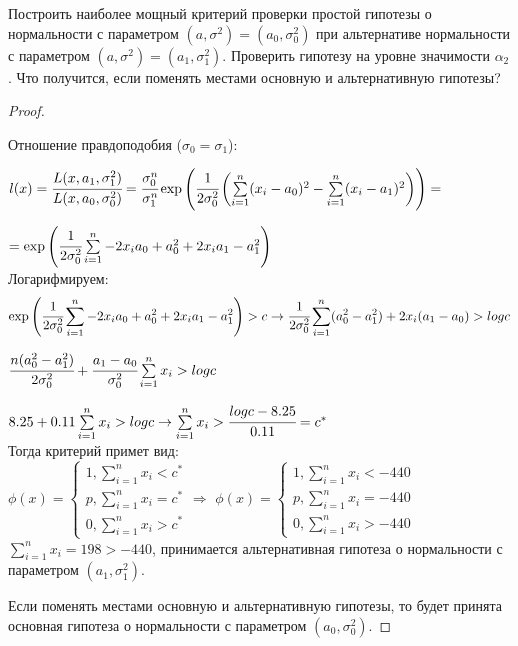 \begin{problem}
	Построить наиболее мощный критерий проверки простой гипотезы о нормальности с параметром $(a, \sigma^2)=(a_0, \sigma_0^2)$ при альтернативе нормальности с параметром $(a, \sigma^2)=(a_1, \sigma_1^2)$. Проверить гипотезу на уровне значимости $\alpha_2$. Что получится, если поменять местами основную и альтернативную гипотезы?
\end{problem}

\begin{proof}
	$ $
	
	Отношение правдоподобия ($\sigma_0 = \sigma_1$):
	
		$l(x)=\cfrac{L(x, a_1, \sigma_1^2)}{L(x, a_0, \sigma_0^2)}=\cfrac{\sigma_0^n}{\sigma_1^n}\exp\left(\cfrac{1}{2\sigma_0^2}\left(\sum\limits_{i=1}^n(x_i-a_0)^2-\sum\limits_{i=1}^n(x_i-a_1)^2\right)\right)=$
		
		$=\exp\left(\cfrac{1}{2\sigma_0^2}\sum\limits_{i=1}^n-2x_ia_0+a_0^2+2x_ia_1-a_1^2\right)$
	\\
	
	Логарифмируем:
	\begin{equation}
		\exp\left(\cfrac{1}{2\sigma_0^2}\sum\limits_{i=1}^n-2x_ia_0+a_0^2+2x_ia_1-a_1^2\right)>c\rightarrow \cfrac{1}{2\sigma_0^2}\sum\limits_{i=1}^n(a_0^2-a_1^2)+2x_i(a_1-a_0)>log c
	\end{equation}


		$\cfrac{n(a_0^2-a_1^2)}{2\sigma_0^2}+\cfrac{a_1-a_0}{\sigma_0^2}\sum\limits_{i=1}^nx_i>log c$
		
	    $8.25+0.11\sum\limits_{i=1}^nx_i>logc\rightarrow\sum\limits_{i=1}^nx_i>\cfrac{logc-8.25}{0.11}=c^*$ \\

	Тогда критерий примет вид: \\
	
	$\phi(x)=\left\{
	\begin{gathered}
		1, \sum\limits_{i=1}^nx_i<c^* \\
		p, \sum\limits_{i=1}^nx_i=c^* \\
		0, \sum\limits_{i=1}^nx_i>c^*
	\end{gathered}
	\right. \Rightarrow $ 
	$ \phi(x)=\left\{
	\begin{gathered}
		1, \sum\limits_{i=1}^nx_i<-440 \\
		p, \sum\limits_{i=1}^nx_i=-440 \\
		0, \sum\limits_{i=1}^nx_i>-440
	\end{gathered}
	\right.$ \\
	
	$\sum\limits_{i=1}^nx_i=198>-440$, принимается альтернативная гипотеза о нормальности с параметром $(a_1, \sigma_1^2)$. 
	
	Если поменять местами основную и альтернативную гипотезы, то будет принята основная гипотеза о нормальности с параметром $(a_0, \sigma_0^2)$.
\end{proof}


